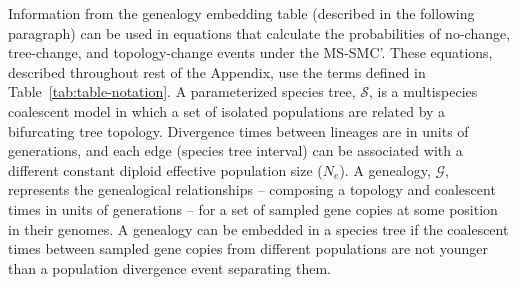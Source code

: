 \documentclass[11pt]{article}
\begin{document}
Information from the genealogy embedding table (described in the following paragraph) can be used 
in equations that 
calculate the 
probabilities of no-change, tree-change, and topology-change events under the 
MS-SMC'. These equations, described throughout rest of the Appendix, use the terms defined in 
Table~\ref{tab:table-notation}. 
A parameterized species tree, $\mathcal{S}$, is a multispecies coalescent 
model in which a set of isolated populations are related by a bifurcating
tree topology. Divergence times between lineages are in units of generations, 
and each edge (species tree interval) can be associated with a different constant 
diploid effective population size ($N_e$). 
A genealogy, $\mathcal{G}$, represents the genealogical relationships -- composing
a topology and coalescent times in units of generations -- for a set 
of sampled gene copies at some position in their genomes. A genealogy can be 
embedded in a species tree if the coalescent times between sampled gene copies
from different populations are not younger than a population divergence
event separating them.
\end{document}
